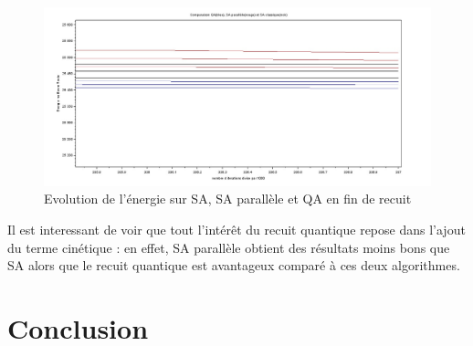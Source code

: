 \documentclass{article}%
\begin{document}
	\begin{figure}[!ht]
		
	\begin{center}
	\includegraphics[scale=0.25]{brazil58_zoom.jpg}
	\caption{Evolution de l'énergie sur SA, SA parallèle et QA en fin de recuit}
	\label{comparaison}
	\end{center}
	\end{figure}

	
		Il est interessant de voir que tout l'intérêt du recuit quantique repose dans l'ajout du terme cinétique : en effet, SA parallèle obtient des résultats moins bons que SA alors que le recuit quantique est avantageux comparé à ces deux algorithmes.
		

\clearpage	
\section*{Conclusion}

\clearpage	
\listoffigures
\listofalgorithms

\end{document}

